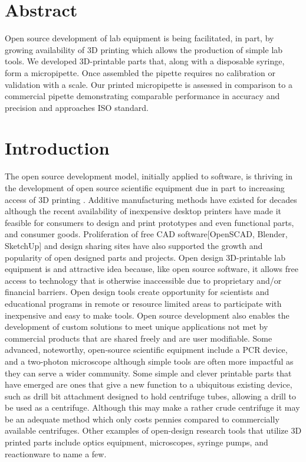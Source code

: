 \documentclass[10pt,letterpaper]{article}
\begin{document}
\section*{Abstract}
Open source development of lab equipment is being facilitated, in part, by growing availability of 3D printing which allows the production of simple lab tools.
We developed 3D-printable parts that, along with a disposable syringe, form a micropipette.
Once assembled the pipette requires no calibration or validation with a scale.
Our printed micropipette is assessed in comparison to a commercial pipette demonstrating comparable performance in accuracy and precision and approaches ISO standard.

\linenumbers

\section*{Introduction}
The open source development model, initially applied to software, is thriving in the development of open source scientific equipment due in part to increasing access of 3D printing \cite{Baden2015,Pearce2014}.
Additive manufacturing methods have existed for decades although the recent availability of inexpensive desktop printers\cite{MakerbotIndustries2016,Reprap2015} have made it feasible for consumers to design and print prototypes and even functional parts, and consumer goods\cite{Fullerton2014}.
Proliferation of free CAD software[OpenSCAD, Blender, SketchUp] and design sharing sites\cite{MakerbotIndustries2016,NationalInstitutesofHealth2015,grabCAD,GitHubInc.2016} have also supported the growth and popularity of open designed parts and projects.
Open design 3D-printable lab equipment is and attractive idea because, like open source software, it allows free access to technology that is otherwise inaccessible due to proprietary and/or financial barriers. 
Open design tools create opportunity for scientists and educational programs in remote or resource limited areas to participate with inexpensive and easy to make tools\cite{Baden2015}. 
Open source development also enables the development of custom solutions to meet unique applications not met by commercial products that are shared freely and are user modifiable\cite{Fullerton2014,Pearce2012}.
Some advanced, noteworthy, open-source scientific equipment include a PCR device\cite{ChaiBiotechnologiesInc2015}, and a two-photon microscope\cite{Rosenegger2014} although simple tools are often more impactful as they can serve a wider community.
Some simple and clever printable parts that have emerged are ones that give a new function to a ubiquitous existing device, such as drill bit attachment designed to hold centrifuge tubes, allowing a drill to be used as a centrifuge\cite{Garvey2009}.
Although this may make a rather crude centrifuge it may be an adequate method which only costs pennies compared to commercially available centrifuges.
Other examples of open-design research tools that utilize 3D printed parts include optics equipment\cite{Zhang2013}, microscopes\cite{Baden2014a,Walus2014}, syringe pumps\cite{Wijnen2014}, and reactionware\cite{Symes2012} to name a few.
\end{document}
